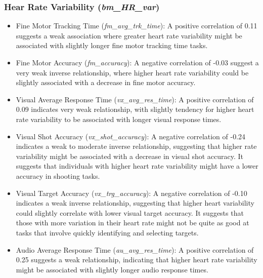 \subsubsection*{Hear Rate Variability (\textit{bm\_HR\_var})}

\begin{itemize}
    \item Fine Motor Tracking Time (\textit{fm\_avg\_trk\_time}): A positive correlation of 0.11 suggests a weak association where greater heart rate variability 
    might be associated with slightly longer fine motor tracking time tasks.
    
    \item Fine Motor Accuracy (\textit{fm\_accuracy}): A negative correlation of -0.03 suggest a very weak inverse relationship, where higher heart rate variability
    could be slightly associated with a decrease in fine motor accuracy.
    
    \item Visual Average Response Time (\textit{vx\_avg\_res\_time}): A positive correlation of 0.09 indicates very weak relationship, with slightly tendency for
    higher heart rate variability to be associated with longer visual response times. 
    
    \item Visual Shot Accuracy (\textit{vx\_shot\_accuracy}): A negative correlation of -0.24 indicates a weak to moderate inverse relationship, suggesting that
    higher rate variability might be associated with a decrease in visual shot accuracy. It suggests that individuals with higher heart rate variability might 
    have a lower accuracy in shooting tasks.
    
    \item Visual Target Accuracy (\textit{vx\_trg\_accuracy}): A negative correlation of -0.10 indicates a weak inverse relationship, suggesting that higher heart 
    variability could slightly correlate with lower visual target accuracy. It suggests that those with more variation in their heart rate might not be quite as good 
    at tasks that involve quickly identifying and selecting targets.
    
    \item Audio Average Response Time (\textit{au\_avg\_res\_time}): A positive correlation of 0.25 suggests a weak relationship, indicating that higher heart rate
    variability might be associated with slightly longer audio response times.
    
\end{itemize}


